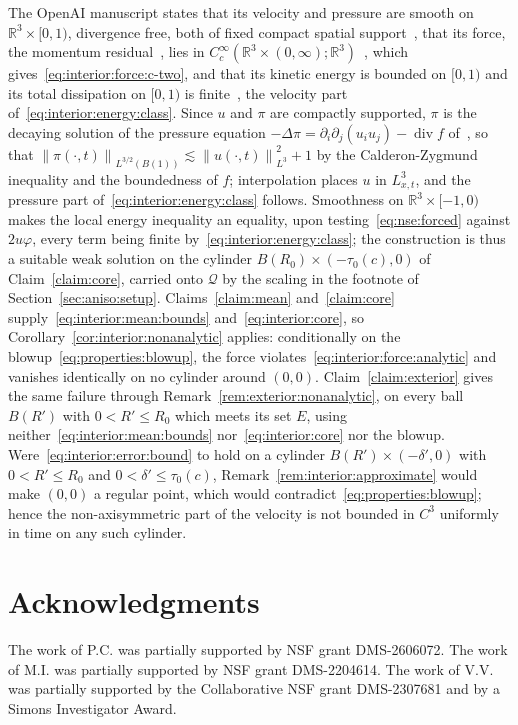 \documentclass[11pt,reqno]{amsproc}
\numberwithin{equation}{section}
\theoremstyle{remark}
\newcommand{\p}{\partial}
\newcommand{\RR}{\mathbb R}
\newcommand{\norm}[1]{\left\|#1\right\|}
\newcommand{\les}{\lesssim}
\renewcommand{\div}{\operatorname{div}}
\begin{document}
The OpenAI manuscript states that its velocity and pressure are smooth on $\RR^3\times[0,1)$, divergence free, both of fixed compact spatial support~\cite[Proposition~10.1, p.~117]{OpenAIManuscript}, that its force, the momentum residual~\cite[equation~(10.5), p.~118]{OpenAIManuscript}, lies in $C^\infty_c(\RR^3\times(0,\infty);\RR^3)$~\cite[Lemma~10.3, p.~120]{OpenAIManuscript}, which gives~\eqref{eq:interior:force:c-two}, and that its kinetic energy is bounded on $[0,1)$ and its total dissipation on $[0,1)$ is finite~\cite[Lemma~10.4 and equation~(10.13), p.~121]{OpenAIManuscript}, the velocity part of~\eqref{eq:interior:energy:class}. Since $u$ and $\pi$ are compactly supported, $\pi$ is the decaying solution of the pressure equation $-\Delta\pi=\p_i\p_j(u_iu_j)-\div f$ of~\cite[p.~118]{OpenAIManuscript}, so that $\norm{\pi(\cdot,t)}_{L^{3/2}(B(1))}\les\norm{u(\cdot,t)}_{L^3}^2+1$ by the Calderon-Zygmund inequality and the boundedness of $f$; interpolation places $u$ in $L^3_{x,t}$, and the pressure part of~\eqref{eq:interior:energy:class} follows. Smoothness on $\RR^3\times[-1,0)$ makes the local energy inequality an equality, upon testing~\eqref{eq:nse:forced} against $2u\varphi$, every term being finite by~\eqref{eq:interior:energy:class}; the construction is thus a suitable weak solution on the cylinder $B(R_0)\times(-\tau_0(c),0)$ of Claim~\ref{claim:core}, carried onto $\mathcal Q$ by the scaling in the footnote of Section~\ref{sec:aniso:setup}. Claims~\ref{claim:mean} and~\ref{claim:core} supply~\eqref{eq:interior:mean:bounds} and~\eqref{eq:interior:core}, so Corollary~\ref{cor:interior:nonanalytic} applies: conditionally on the blowup~\eqref{eq:properties:blowup}, the force violates~\eqref{eq:interior:force:analytic} and vanishes identically on no cylinder around $(0,0)$. Claim~\ref{claim:exterior} gives the same failure through Remark~\ref{rem:exterior:nonanalytic}, on every ball $B(R')$ with $0<R'\le R_0$ which meets its set $E$, using neither~\eqref{eq:interior:mean:bounds} nor~\eqref{eq:interior:core} nor the blowup. Were~\eqref{eq:interior:error:bound} to hold on a cylinder $B(R')\times(-\delta',0)$ with $0<R'\le R_0$ and $0<\delta'\le\tau_0(c)$, Remark~\ref{rem:interior:approximate} would make $(0,0)$ a regular point, which would contradict~\eqref{eq:properties:blowup}; hence the non-axisymmetric part of the velocity is not bounded in $C^3$ uniformly in time on any such cylinder.

\section*{Acknowledgments}
The work of P.C. was partially supported by NSF grant DMS-2606072. The work of M.I. was partially supported by NSF grant DMS-2204614. The work of V.V. was partially supported by the Collaborative NSF grant DMS-2307681 and by a Simons Investigator Award.
\end{document}
